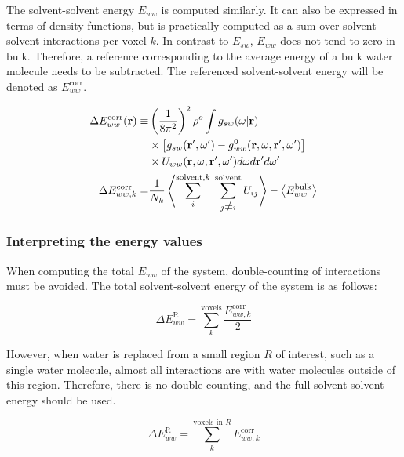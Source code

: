 \documentclass[9pt,tutorial]{livecoms}
\renewcommand{\neq}{\setbox0\hbox{=}\rlap{\hbox to \wd0{\hss /\hss}}\box0}
\begin{document}
The solvent-solvent energy $E_{ww}$ is computed similarly.
It can also be expressed in terms of density functions, but is practically computed as a sum over solvent-solvent interactions per voxel $k$.
In contrast to $E_{sw}$, $E_{ww}$ does not tend to zero in bulk.
Therefore, a reference corresponding to the average energy of a bulk water molecule needs to be subtracted.
The referenced solvent-solvent energy will be denoted as $E_{ww}^\text{corr}$.

\begin{equation}
	\begin{aligned}
		\Delta E_{ww}^\text{corr}(\textbf{r}) \equiv & \left(\frac{1}{8\pi^2} \right)^2 \rho^o \int g_{sw}(\omega|\textbf{r}) \\
			& \times \left[g_{sw}(\textbf{r}^\prime , \omega^\prime) - g^0_{ww} (\textbf{r}, \omega, \textbf{r}^\prime, \omega^\prime )\right] \\
			& \times U_{ww}(\textbf{r}, \omega, \textbf{r}^\prime, \omega^\prime)d\omega d\textbf{r}^\prime d\omega^\prime \\
		\Delta E_{ww,k}^\text{corr} =& \frac{1}{N_k} \left\langle \sum_i^{\text{solvent},k} \; \sum_{j \neq i}^\text{solvent} U_{ij}\right\rangle - \left\langle E_{ww}^\text{bulk}\right\rangle
	\end{aligned}
\end{equation}

\subsubsection{Interpreting the energy values}
When computing the total $E_{ww}$ of the system, double-counting of interactions must be avoided.
The total solvent-solvent energy of the system is as follows:

\begin{equation}
	\Delta E^\text{R}_{ww} = \sum_{k}^\text{voxels} \frac{E_{ww,k}^\text{corr}}{2}
\end{equation}

However, when water is replaced from a small region $R$ of interest, such as a single water molecule, almost all interactions are with water molecules outside of this region.
Therefore, there is no double counting, and the full solvent-solvent energy should be used.

\begin{equation}
	\Delta E^\text{R}_{ww} = \sum_{k}^{\text{voxels in }R} E_{ww,k}^\text{corr}
\end{equation}
\end{document}
